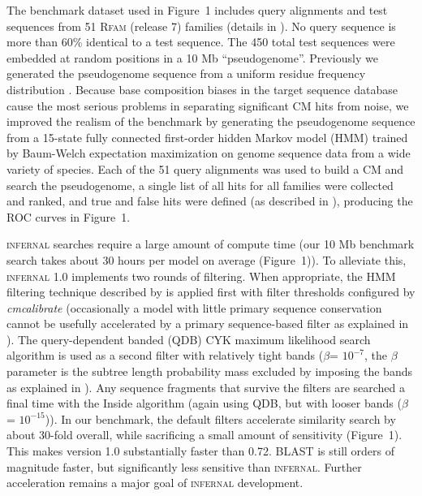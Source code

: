 \documentclass{bioinfo}
\begin{document}
\begin{application}
The benchmark dataset used in Figure~1 includes query alignments and
test sequences from 51 \textsc{Rfam} (release 7) families (details in
\citep{NawrockiEddy07}).  No query sequence is more than 60\% identical
to a test sequence.  The 450 total test sequences were embedded at
random positions in a 10 Mb ``pseudogenome''.  Previously we generated
the pseudogenome sequence from a uniform residue frequency
distribution \citep{NawrockiEddy07}.  Because base composition biases
in the target sequence database cause the most serious problems in
separating significant CM hits from noise, we improved the realism of
the benchmark by generating the pseudogenome sequence from a 15-state
fully connected first-order hidden Markov model (HMM) trained by
Baum-Welch expectation maximization \citep{Durbin98} on genome
sequence data from a wide variety of species.  Each of the 51 query
alignments was used to build a CM and search the pseudogenome, a
single list of all hits for all families were collected and ranked,
and true and false hits were defined (as described in
\citet{NawrockiEddy07}), producing the ROC curves in Figure~1.

\textsc{infernal} searches require a large amount of compute time (our
10 Mb benchmark search takes about 30 hours per model on average
(Figure~1)). To alleviate this, \textsc{infernal} 1.0 implements two
rounds of filtering.  When appropriate, the HMM filtering technique
described by \citet{WeinbergRuzzo06} is applied first with filter
thresholds configured by \emph{cmcalibrate} (occasionally a model with
little primary sequence conservation cannot be usefully accelerated by
a primary sequence-based filter as explained in \citep{infguide03}).  The
query-dependent banded (QDB) CYK maximum likelihood search algorithm
is used as a second filter with relatively tight bands ($\beta$=
$10^{-7}$, the $\beta$ parameter is the subtree length probability
mass excluded by imposing the bands as explained in
\citep{NawrockiEddy07}).  Any sequence fragments that survive the
filters are searched a final time with the Inside algorithm (again
using QDB, but with looser bands ($\beta$= $10^{-15}$)).  In our
benchmark, the default filters accelerate similarity search by about
30-fold overall, while sacrificing a small amount of sensitivity
(Figure~1). This makes version 1.0 substantially faster than
0.72. \textsc{BLAST} is still orders of magnitude faster, but
significantly less sensitive than \textsc{infernal}. Further
acceleration remains a major goal of \textsc{infernal} development.


\end{application}
\end{document}
